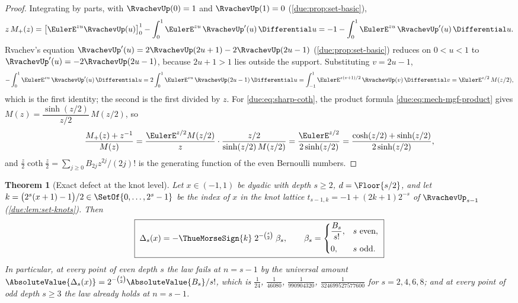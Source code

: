 \documentclass[11pt,oneside]{article}
\theoremstyle{plain}
\newtheorem{theorem}{Theorem}[section]
\theoremstyle{definition}
\theoremstyle{remark}
\newcommand{\upn}[1]{\RvachevUp_{#1}}
\begin{document}
\begin{proof}
Integrating by parts, with $\RvachevUp(0)=1$ and $\RvachevUp(1)=0$
(\cref{due:prop:set-basic}),
\[
 z\,M_{+}(z)=\bigl[\EulerE^{zu}\RvachevUp(u)\bigr]_{0}^{1}
 -\int_{0}^{1}\EulerE^{zu}\,\RvachevUp'(u)\,\Differential u
 =-1-\int_{0}^{1}\EulerE^{zu}\,\RvachevUp'(u)\,\Differential u .
\]
Rvachev's equation $\RvachevUp'(u)=2\RvachevUp(2u+1)-2\RvachevUp(2u-1)$
(\cref{due:prop:set-basic}) reduces on $0<u<1$ to
$\RvachevUp'(u)=-2\RvachevUp(2u-1)$, because $2u+1>1$ lies outside the
support.  Substituting $v=2u-1$,
\[
 -\int_{0}^{1}\EulerE^{zu}\,\RvachevUp'(u)\,\Differential u
 =2\int_{0}^{1}\EulerE^{zu}\,\RvachevUp(2u-1)\,\Differential u
 =\int_{-1}^{1}\EulerE^{z(v+1)/2}\,\RvachevUp(v)\,\Differential v
 =\EulerE^{z/2}\,M(z/2),
\]
which is the first identity; the second is the first divided by $z$.
For \cref{due:eq:sharp-coth}, the product formula
\cref{due:eq:mech-mgf-product} gives
$M(z)=\dfrac{\sinh(z/2)}{z/2}\,M(z/2)$, so
\[
 \frac{M_{+}(z)+z^{-1}}{M(z)}
 =\frac{\EulerE^{z/2}M(z/2)}{z}\cdot\frac{z/2}{\sinh(z/2)\,M(z/2)}
 =\frac{\EulerE^{z/2}}{2\sinh(z/2)}
 =\frac{\cosh(z/2)+\sinh(z/2)}{2\sinh(z/2)},
\]
and $\frac z2\coth\frac z2=\sum_{j\ge0}B_{2j}z^{2j}/(2j)!$ is the
generating function of the even Bernoulli numbers.
\end{proof}

\begin{theorem}[Exact defect at the knot level]
\label{due:thm:sharp-knot-defect}
Let $x\in(-1,1)$ be dyadic with depth $s\ge2$, $d=\Floor{s/2}$, and let
$k=\bigl(2^{s}(x+1)-1\bigr)/2\in\SetOf{0,\ldots,2^{s}-1}$ be the index of
$x$ in the knot lattice $t_{s-1,k}=-1+(2k+1)2^{-s}$ of $\upn{s-1}$
(\cref{due:lem:set-knots}).  Then
\begin{equation}
 \boxed{\;
 \Delta_{s}(x)=-\ThueMorseSign{k}\;2^{-\binom{s}{2}}\;\beta_{s},
 \qquad
 \beta_{s}=\begin{cases}
  \dfrac{B_{s}}{s!}, & s\ \text{even},\\[0.7em]
  0, & s\ \text{odd}.
 \end{cases}\;}
 \label{due:eq:sharp-knot-defect}
\end{equation}
In particular, at every point of even depth $s$ the law fails at
$n=s-1$ by the universal amount
$\AbsoluteValue{\Delta_{s}(x)}=2^{-\binom s2}\AbsoluteValue{B_{s}}/s!$, which
is $\tfrac1{24}$, $\tfrac1{46080}$, $\tfrac1{990904320}$,
$\tfrac1{324699527577600}$ for $s=2,4,6,8$; and at every point of odd
depth $s\ge3$ the law already holds at $n=s-1$.
\end{theorem}
\end{document}
